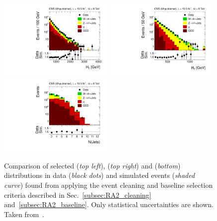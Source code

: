 \begin{figure}[!t]
  \centering
  \begin{minipage}[c]{1.\textwidth}
    \begin{center}
      \includegraphics[width=0.49\textwidth]{figures/RA2_baseline_MC_HT.pdf}  
      \includegraphics[width=0.49\textwidth]{figures/RA2_baseline_MC_MHT.pdf} \\
      \includegraphics[width=0.49\textwidth]{figures/RA2_baseline_MC_NJets.pdf}
    \end{center}
  \end{minipage}

  \caption{Comparison of selected \HT (\textit{top left}), \MHT (\textit{top right}) and \NJets (\textit{bottom}) distributions in data (\textit{black dots}) and simulated events (\textit{shaded curve}) found from applying the event cleaning and baseline selection criteria described in Sec.~\ref{subsec:RA2_cleaning} and~\ref{subsec:RA2_baseline}. Only statistical uncertainties are shown. Taken from~\cite{Chatrchyan:2014lfa}.}
  \label{fig:ra2_baseline_mc}
\end{figure}

